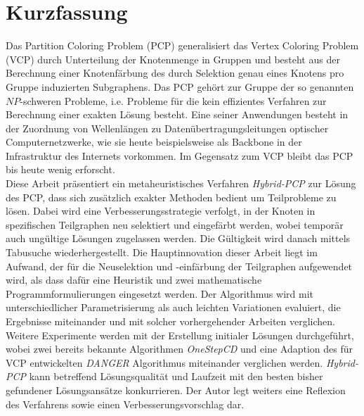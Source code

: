 \chapter*{Kurzfassung}

Das Partition Coloring Problem (PCP) generalisiert das Vertex Coloring Problem (VCP) durch Unterteilung der Knotenmenge in Gruppen und besteht aus der Berechnung einer Knotenfärbung des durch Selektion genau eines Knotens pro Gruppe induzierten Subgraphens. Das PCP gehört zur Gruppe der so genannten $\mathit{NP}$-schweren Probleme, i.e. Probleme für die kein effizientes Verfahren zur Berechnung einer exakten Lösung besteht. Eine seiner Anwendungen besteht in der Zuordnung von Wellenlängen zu Datenübertragungsleitungen optischer Computernetzwerke, wie sie heute beispielsweise als Backbone in der Infrastruktur des Internets vorkommen. Im Gegensatz zum VCP bleibt das PCP bis heute wenig erforscht.\\

Diese Arbeit präsentiert ein metaheuristisches Verfahren \textit{Hybrid-PCP} zur Lösung des PCP, dass sich zusätzlich exakter Methoden bedient um Teilprobleme zu lösen. Dabei wird eine Verbesserungsstrategie verfolgt, in der Knoten in spezifischen Teilgraphen neu selektiert und eingefärbt werden, wobei temporär auch ungültige Lösungen zugelassen werden. Die Gültigkeit wird danach mittels Tabusuche wiederhergestellt. Die Hauptinnovation dieser Arbeit liegt im Aufwand, der für die Neuselektion und -einfärbung der Teilgraphen aufgewendet wird, als dass dafür eine Heuristik und zwei mathematische Programmformulierungen eingesetzt werden. Der Algorithmus wird mit unterschiedlicher Parametrisierung als auch leichten Variationen evaluiert, die Ergebnisse miteinander und mit solcher vorhergehender Arbeiten verglichen. Weitere Experimente werden mit der Erstellung initialer Lösungen durchgeführt, wobei zwei bereits bekannte Algorithmen \textit{OneStepCD} und eine Adaption des für VCP entwickelten \textit{DANGER} Algorithmus miteinander verglichen werden. \textit{Hybrid-PCP} kann betreffend Lösungsqualität und Laufzeit mit den besten bisher gefundener Lösungsansätze konkurrieren. Der Autor legt weiters eine Reflexion des Verfahrens sowie einen Verbesserungsvorschlag dar.
